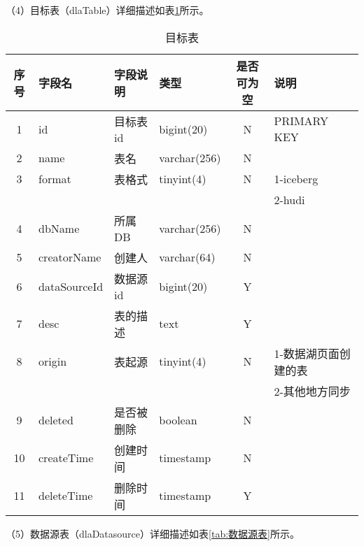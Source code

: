 （4）目标表（dlaTable）详细描述如表\ref{tab:目标表}所示。

\begin{table}[H]
  \centering
  \caption{目标表}
  \label{tab:目标表}
  \begin{tabular}{clllcl}
    \toprule
    序号  & 字段名              & 字段说明     & 类型           & 是否可为空   & 说明  \\
    \midrule
    1    & id                 & 目标表id     & bigint(20)    & N          & PRIMARY KEY    \\
    2    & name               & 表名         & varchar(256)  & N          &    \\
    3    & format             & 表格式       & tinyint(4)    & N          & 1-iceberg  \\
         &                    &             &               &            & 2-hudi  \\
    4    & dbName             & 所属DB       & varchar(256)  & N          &   \\
    5    & creatorName        & 创建人       & varchar(64)   & N          &   \\
    6    & dataSourceId       & 数据源id     & bigint(20)    & Y          &    \\
    7    & desc               & 表的描述     & text           & Y          &   \\
    8    & origin             & 表起源       & tinyint(4)    & N          & 1-数据湖页面创建的表   \\
         &                    &             &               &            & 2-其他地方同步  \\
    9    & deleted            & 是否被删除    & boolean       & N          &   \\
    10   & createTime         & 创建时间     & timestamp     & N          &    \\
    11   & deleteTime         & 删除时间     & timestamp     & Y          &   \\
    \bottomrule
  \end{tabular}
\end{table}

（5）数据源表（dlaDatasource）详细描述如表\ref{tab:数据源表}所示。

